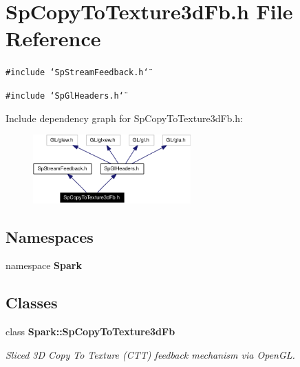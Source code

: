 \section{Sp\-Copy\-To\-Texture3d\-Fb.h File Reference}
\label{SpCopyToTexture3dFb_8h}
{\tt \#include \char`\"{}Sp\-Stream\-Feedback.h\char`\"{}}\par
{\tt \#include \char`\"{}Sp\-Gl\-Headers.h\char`\"{}}\par


Include dependency graph for Sp\-Copy\-To\-Texture3d\-Fb.h:\begin{figure}[H]
\begin{center}
\leavevmode
\includegraphics[width=172pt]{SpCopyToTexture3dFb_8h__incl}
\end{center}
\end{figure}
\subsection*{Namespaces}
\begin{CompactItemize}
\item 
namespace {\bf Spark}
\end{CompactItemize}
\subsection*{Classes}
\begin{CompactItemize}
\item 
class {\bf Spark::Sp\-Copy\-To\-Texture3d\-Fb}
\begin{CompactList}\small\item\em Sliced 3D Copy To Texture (CTT) feedback mechanism via Open\-GL. \item\end{CompactList}\end{CompactItemize}

